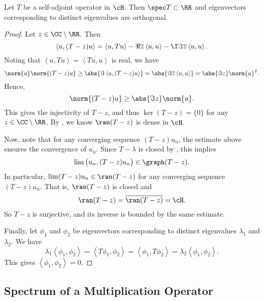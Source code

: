 \documentclass[oneside,reqno,letterpaper]{amsart}
\begin{document}
\begin{theorem}
\label{thm:self-adjoint-spectrum}
  Let \(T\) be a self-adjoint operator in \(\cH\). 
  Then \(\spec T \subset \RR\) and eigenvectors corresponding to distinct eigenvalues are orthogonal.
\end{theorem}
\begin{proof}
  Let \(z \in \CC \setminus \RR\). Then 
  \[
    \left< u, (T - z) u \right> = \left< u, Tu \right> - \Re \overline{z}\left< u, u \right> - \I \Im \overline{z}\left< u, u \right>. 
  \] 
  Noting that \(\left< u, Tu \right> = \overline{\left< Tu, u \right>}\) is real, we have 
  \[
    \norm{u} \norm{(T - z)u}
    \geq \abs{\Im \left< u, (T - z) u \right>} 
    = \abs{\Im \overline{z} \left< u, u \right>} 
    = \abs{\Im z} \norm{u}^2 . 
  \] 
  Hence, 
  \[
    \norm{(T - z) u} \geq \abs{\Im z} \norm{u} .
  \] 
  This gives the injectivity of \(T - z\), and thus \(\ker(T - z) = \{0\}\) for any \(z \in \CC \setminus \RR\). 
  By , we know \(\ran(T - z)\) is dense in \(\cH\).  

  Now, note that for any converging sequence \((T - z) u_n\), the estimate above ensures the convergence of \(u_n\). 
  Since \(T - \lambda\) is closed by , this implies 
  \[
    \lim \big( u_n, (T - z) u_n \big) \in \graph(T - z). 
  \] 
  In particular, \(\lim (T - z) u_n \in \ran(T - z)\) for any converging sequence \((T - z) u_n\).
  That is, \(\ran(T - z)\) is closed and 
  \[
    \ran(T - z) = \overline{\ran(T - z)} = \cH . 
  \]
  So \(T - z\) is surjective, and its inverse is bounded by the same estimate.

  Finally, let \(\phi_1\) and \(\phi_2\) be eigenvectors corresponding to distinct eigenvalues \(\lambda_1\) and \(\lambda_2\). 
  We have 
  \[
    \lambda_1 \left< \phi_1, \phi_2 \right>
    = \left< T \phi_1, \phi_2 \right>
    = \left< \phi_1, T \phi_2 \right>
    = \lambda_2 \left< \phi_1, \phi_2 \right> . 
  \] 
  This gives \(\left< \phi_1, \phi_2 \right> = 0\). 
\end{proof}






\subsection{Spectrum of a Multiplication Operator}
\end{document}
